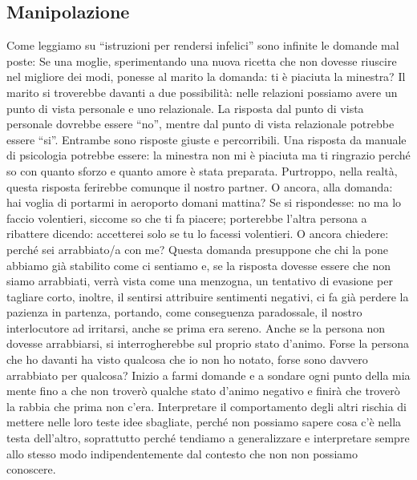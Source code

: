 \documentclass[12pt]{book} %
\begin{document}
\subsection{Manipolazione}
Come leggiamo su “istruzioni per rendersi
infelici” sono infinite le
domande mal poste: Se una moglie, sperimentando una nuova ricetta che non dovesse riuscire nel migliore dei modi,
ponesse al marito la domanda: ti è piaciuta la minestra? Il marito si troverebbe davanti a due possibilità: nelle
relazioni possiamo avere un punto di vista personale e uno relazionale. La risposta dal punto di vista personale
dovrebbe essere “no”, mentre dal punto di vista relazionale potrebbe essere “si”. Entrambe sono risposte giuste e
percorribili. Una risposta da manuale di psicologia potrebbe essere: la minestra non mi è piaciuta ma ti ringrazio
perché so con quanto sforzo e quanto amore è stata preparata. Purtroppo, nella realtà, questa risposta ferirebbe
comunque il nostro partner. O ancora, alla domanda: hai voglia di portarmi in aeroporto domani mattina? Se si
rispondesse: no ma lo faccio volentieri, siccome so che ti fa piacere; porterebbe l'altra persona a ribattere dicendo:
accetterei solo se tu lo facessi volentieri. O ancora chiedere: perché sei arrabbiato/a con me? Questa domanda
presuppone che chi la pone abbiamo già stabilito come ci sentiamo e, se la risposta dovesse essere che non siamo
arrabbiati, verrà vista come una menzogna, un tentativo di evasione per tagliare corto, inoltre, il sentirsi attribuire
sentimenti negativi, ci fa già perdere la pazienza in partenza, portando, come conseguenza paradossale, il nostro
interlocutore ad irritarsi, anche se prima era sereno. Anche se la persona non dovesse arrabbiarsi, si interrogherebbe
sul proprio stato d'animo. Forse la persona che ho davanti ha visto qualcosa che io non ho notato,
forse sono davvero arrabbiato per qualcosa? Inizio a farmi domande e a sondare ogni punto della mia mente fino a che
non troverò qualche stato d'animo negativo e finirà che troverò la rabbia che prima non
c'era. Interpretare il comportamento degli altri rischia di mettere nelle loro teste idee
sbagliate, perché non possiamo sapere cosa c'è nella testa dell'altro, soprattutto perché tendiamo a generalizzare e
interpretare sempre allo stesso modo indipendentemente dal contesto che non non possiamo conoscere. 


\bigskip
\end{document}
